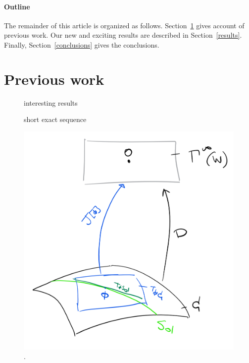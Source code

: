\documentclass[12pt]{article}
\begin{document}
\paragraph{Outline}
The remainder of this article is organized as follows.
Section~\ref{previous work} gives account of previous work.
Our new and exciting results are described in Section~\ref{results}.
Finally, Section~\ref{conclusions} gives the conclusions.

\section{Previous work}\label{previous work}
\begin{figure}
  \centering
  
  \caption{interesting results}
\end{figure}
\begin{figure}
  \centering
  \caption{short exact sequence}
\end{figure}
\begin{figure}
  \centering
  \includegraphics{Pictures/jacobi.png}
  \caption{.}
\end{figure}
\end{document}
